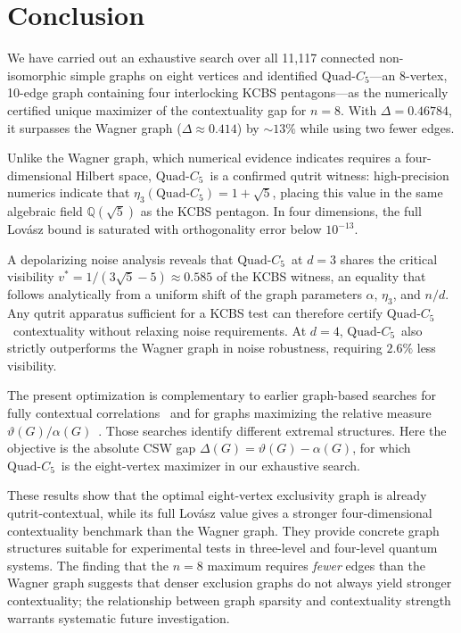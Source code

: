 \documentclass[aps,pra,twocolumn,superscriptaddress,longbibliography,floatfix]{revtex4-2}
\newcommand{\vt}{\vartheta}
\newcommand{\al}{\alpha}
\newcommand{\De}{\Delta}
\newcommand{\QC}{\ensuremath{\text{Quad-}C_5}}
\begin{document}
\section{Conclusion}

We have carried out an exhaustive search over all 11{,}117 connected
non-isomorphic simple graphs on eight vertices and identified
\QC---an 8-vertex, 10-edge graph containing four interlocking
KCBS pentagons---as the numerically certified unique maximizer of the contextuality gap for $n=8$.
With $\De=0.46784$, it surpasses the Wagner graph ($\De\approx0.414$) by
$\sim\!13\%$ while using two fewer edges.

Unlike the Wagner graph, which numerical evidence indicates requires a
four-dimensional Hilbert space, \QC\ is a confirmed qutrit
witness: high-precision numerics indicate that
$\eta_3(\QC)=1+\sqrt{5}$, placing this value in the same
algebraic field $\mathbb{Q}(\sqrt{5})$ as the KCBS pentagon.
In four dimensions, the full Lov\'{a}sz bound is saturated with
orthogonality error below $10^{-13}$.

A depolarizing noise analysis reveals that \QC\ at $d=3$ shares the
critical visibility $v^*=1/(3\sqrt{5}-5)\approx0.585$ of the KCBS witness,
an equality that follows analytically from a uniform shift of the graph
parameters $\al$, $\eta_3$, and $n/d$.
Any qutrit apparatus sufficient for a KCBS test can therefore certify
\QC\ contextuality without relaxing noise requirements.
At $d=4$, \QC\ also strictly outperforms the Wagner graph in noise
robustness, requiring $2.6\%$ less visibility.

The present optimization is complementary to earlier graph-based searches
for fully contextual correlations~\cite{Amselem2012} and for graphs
maximizing the relative measure $\vt(G)/\al(G)$~\cite{Canas2016}.
Those searches identify different extremal structures. Here the objective
is the absolute CSW gap $\De(G)=\vt(G)-\al(G)$, for which \QC\ is the
eight-vertex maximizer in our exhaustive search.

These results show that the optimal eight-vertex exclusivity graph is already
qutrit-contextual, while its full Lov\'{a}sz value gives a stronger
four-dimensional contextuality benchmark than the Wagner graph.
They provide concrete graph structures suitable for experimental tests in
three-level and four-level quantum systems.
The finding that the $n=8$ maximum requires \emph{fewer} edges than the
Wagner graph suggests that denser exclusion graphs do not always yield
stronger contextuality; the relationship between graph sparsity and
contextuality strength warrants systematic future investigation.
\end{document}
